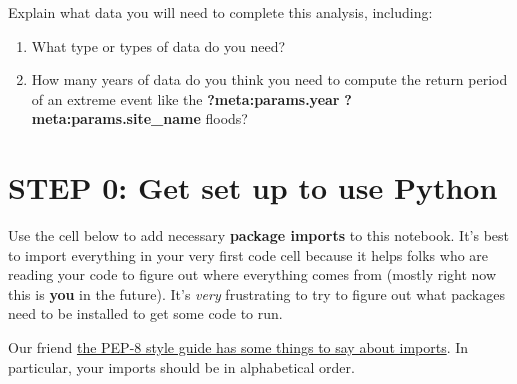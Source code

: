 \documentclass[
  letterpaper,
  DIV=11,
  numbers=noendperiod,
  oneside]{scrreprt}
\providecommand{\tightlist}{%
  \setlength{\itemsep}{0pt}\setlength{\parskip}{0pt}}
\begin{document}
\begin{tcolorbox}[enhanced jigsaw, colbacktitle=quarto-callout-color!10!white, opacityback=0, bottomtitle=1mm, toptitle=1mm, bottomrule=.15mm, left=2mm, colframe=quarto-callout-color-frame, leftrule=.75mm, opacitybacktitle=0.6, colback=white, rightrule=.15mm, toprule=.15mm, breakable, titlerule=0mm, title=\textcolor{quarto-callout-color}{\faInfo}\hspace{0.5em}{Reflect and Respond}, coltitle=black, arc=.35mm]

Explain what data you will need to complete this analysis, including:

\begin{enumerate}
\def\labelenumi{\arabic{enumi}.}
\tightlist
\item
  What type or types of data do you need?
\item
  How many years of data do you think you need to compute the return
  period of an extreme event like the \textbf{?meta:params.year}
  \textbf{?meta:params.site\_name} floods?
\end{enumerate}

\end{tcolorbox}

\section{STEP 0: Get set up to use
Python}\label{step-0-get-set-up-to-use-python}

Use the cell below to add necessary \textbf{package imports} to this
notebook. It's best to import everything in your very first code cell
because it helps folks who are reading your code to figure out where
everything comes from (mostly right now this is \textbf{you} in the
future). It's \emph{very} frustrating to try to figure out what packages
need to be installed to get some code to run.

\begin{tcolorbox}[enhanced jigsaw, colbacktitle=quarto-callout-note-color!10!white, opacityback=0, bottomtitle=1mm, toptitle=1mm, bottomrule=.15mm, left=2mm, colframe=quarto-callout-note-color-frame, leftrule=.75mm, opacitybacktitle=0.6, colback=white, rightrule=.15mm, toprule=.15mm, breakable, titlerule=0mm, title=\textcolor{quarto-callout-note-color}{\faInfo}\hspace{0.5em}{Note}, coltitle=black, arc=.35mm]

Our friend \href{https://peps.python.org/pep-0008/\#imports}{the PEP-8
style guide has some things to say about imports}. In particular, your
imports should be in alphabetical order.

\end{tcolorbox}
\end{document}
